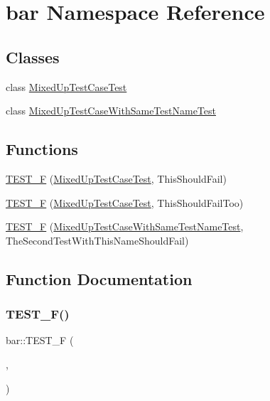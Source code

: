 \hypertarget{namespacebar}{}\section{bar Namespace Reference}
\label{namespacebar}
\subsection*{Classes}
\begin{DoxyCompactItemize}
\item 
class \hyperlink{classbar_1_1_mixed_up_test_case_test}{Mixed\+Up\+Test\+Case\+Test}
\item 
class \hyperlink{classbar_1_1_mixed_up_test_case_with_same_test_name_test}{Mixed\+Up\+Test\+Case\+With\+Same\+Test\+Name\+Test}
\end{DoxyCompactItemize}
\subsection*{Functions}
\begin{DoxyCompactItemize}
\item 
\hyperlink{namespacebar_a0e342ef00f400f593f866279689c55ac}{T\+E\+S\+T\+\_\+F} (\hyperlink{classbar_1_1_mixed_up_test_case_test}{Mixed\+Up\+Test\+Case\+Test}, This\+Should\+Fail)
\item 
\hyperlink{namespacebar_adf88eb6e7ed65a5bd641aa80b237ea2c}{T\+E\+S\+T\+\_\+F} (\hyperlink{classbar_1_1_mixed_up_test_case_test}{Mixed\+Up\+Test\+Case\+Test}, This\+Should\+Fail\+Too)
\item 
\hyperlink{namespacebar_a600f9a0c34015b598089fb6b69adc63a}{T\+E\+S\+T\+\_\+F} (\hyperlink{classbar_1_1_mixed_up_test_case_with_same_test_name_test}{Mixed\+Up\+Test\+Case\+With\+Same\+Test\+Name\+Test}, The\+Second\+Test\+With\+This\+Name\+Should\+Fail)
\end{DoxyCompactItemize}


\subsection{Function Documentation}
\mbox{\label{namespacebar_a0e342ef00f400f593f866279689c55ac}} 
\subsubsection{\texorpdfstring{T\+E\+S\+T\+\_\+\+F()}{TEST\_F()}\hspace{0.1cm}{\footnotesize\ttfamily [1/3]}}
{\footnotesize\ttfamily bar\+::\+T\+E\+S\+T\+\_\+F (\begin{DoxyParamCaption}\item[{\hyperlink{classbar_1_1_mixed_up_test_case_test}{Mixed\+Up\+Test\+Case\+Test}}]{,  }\item[{This\+Should\+Fail}]{ }\end{DoxyParamCaption})}

